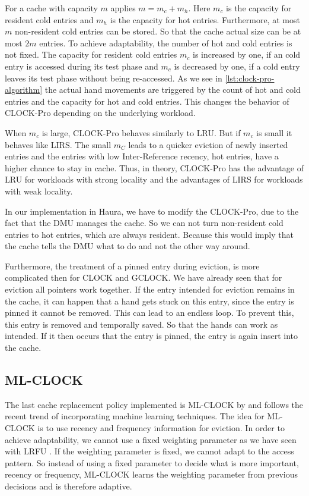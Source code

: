\documentclass[
	12pt,
	a4paper,
	abstract,
	bibliography=totoc,
	chapterprefix,
	headings=openright,
	numbers=endperiod,
	parskip=half,
	twoside,
]{scrreprt}
\begin{document}
For a cache with capacity $m$ applies $m = m_c + m_h$.
Here $m_c$ is the capacity for resident cold entries and $m_h$ is the capacity for hot entries.
Furthermore, at most $m$ non-resident cold entries can be stored.
So that the cache actual size can be at most $2m$ entries.
To achieve adaptability, the number of hot and cold entries is not fixed.
The capacity for resident cold entries $m_c$ is increased by one, if an cold entry is accessed during its test phase 
and $m_c$ is decreased by one, if a cold entry leaves its test phase without being re-accessed.
As we see in \cref{lst:clock-pro-algorithm} the actual hand movements are triggered by the count of hot and cold entries and the 
capacity for hot and cold entries.
This changes the behavior of CLOCK-Pro depending on the underlying workload.

When $m_c$ is large, CLOCK-Pro behaves similarly to LRU. But if $m_c$ is small it behaves like LIRS.
The small $m_C$ leads to a quicker eviction of newly inserted entries and the entries with low Inter-Reference recency, hot entries, have a higher 
chance to stay in cache. Thus, in theory, CLOCK-Pro has the advantage of LRU for workloads with strong locality and 
the advantages of LIRS for workloads with weak locality.

In our implementation in Haura, we have to modify the CLOCK-Pro, due to the fact that the DMU manages the cache.
So we can not turn non-resident cold entries to hot entries, which are always resident.
Because this would imply that the cache tells the DMU what to do and not the other way around.

Furthermore, the treatment of a pinned entry during eviction, is more complicated then for CLOCK and GCLOCK.
We have already seen that for eviction all pointers work together. If the entry intended for eviction remains in the cache, it can happen that a 
hand gets stuck on this entry, since the entry is pinned it cannot be removed. This can lead to an endless loop. To prevent this, this entry is 
removed and temporally saved. So that the hands can work as intended.
If it then occurs that the entry is pinned, the entry is again insert into the cache.

\subsection{ML-CLOCK}
\label{sub:ml-clock}

The last cache replacement policy implemented is ML-CLOCK by \cite{cho2021ml} and 
follows the recent trend of incorporating machine learning techniques.
The idea for ML-CLOCK is to use recency and frequency information for eviction.
In order to achieve adaptability, we cannot use a fixed weighting parameter as we have seen with LRFU \cite{lee2001lrfu}. 
If the weighting parameter is fixed, we cannot adapt to the access pattern.
So instead of using a fixed parameter to decide what is more important, recency 
or frequency,
ML-CLOCK learns the weighting parameter from previous decisions and is therefore adaptive.
\end{document}
